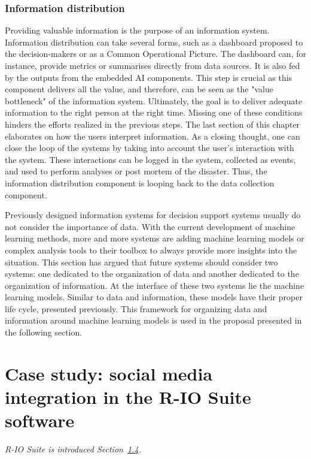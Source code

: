 \subsubsection{Information distribution}
\label{sec:information-distribution}
Providing valuable information is the purpose of an information system.
Information distribution can take several forms, such as a dashboard proposed to the decision-makers or as a Common Operational Picture.
The dashboard can, for instance, provide metrics or summarises directly from data sources.
It is also fed by the outputs from the embedded AI components.
This step is crucial as this component delivers all the value, and therefore, can be seen as the "value bottleneck" of the information system.
Ultimately, the goal is to deliver adequate information to the right person at the right time.
Missing one of these conditions hinders the efforts realized in the previous steps.
The last section of this chapter elaborates on how the users interpret information.
As a closing thought, one can close the loop of the systems by taking into account the user's interaction with the system.
These interactions can be logged in the system, collected as events, and used to perform analyses or post mortem of the disaster.
Thus, the information distribution component is looping back to the data collection component.

Previously designed information systems for decision support systems usually do not consider the importance of data.
With the current development of machine learning methods, more and more systems are adding machine learning models or complex analysis tools to their toolbox to always provide more insights into the situation.
This section has argued that future systems should consider two systems: one dedicated to the organization of data and another dedicated to the organization of information.
At the interface of these two systems lie the machine learning models.
Similar to data and information, these models have their proper life cycle, presented previously.
This framework for organizing data and information around machine learning models is used in the proposal presented in the following section.

\section{Case study: social media integration in the R-IO Suite software}
\textit{R-IO Suite is introduced Section~\hyperref[sec:academic-domains]{1.4}.}

